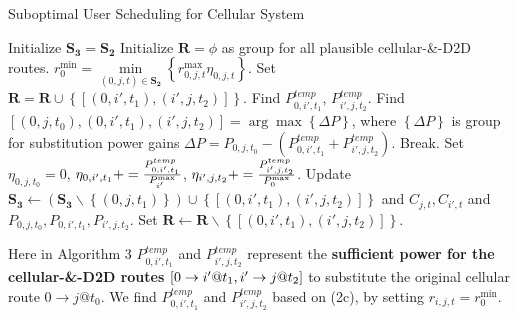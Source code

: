 \documentclass{ieeeaccess}
\begin{document}
\begin{algorithm}[!h]
\caption{Suboptimal User Scheduling for Cellular System}
\label{alg:1}
\begin{algorithmic}[1]
\STATE Initialize ${{\mathbf{S}}_{\mathbf{3}}}={{\mathbf{S}}_{\mathbf{2}}}$
  \STATE Initialize ${\mathbf{R}} = \phi $ as group for all plausible cellular-\&-D2D routes.
  \STATE $r_0^{\min } = \mathop {\min }\limits_{\left( {0,j,t} \right) \in {{\mathbf{S}}_{\mathbf{2}}}} \left\{ {r_{0,j,t}^{\max }{\eta _{0,j,t}}} \right\}$.
            \STATE Set ${\mathbf{R = R}} \cup \left\{ {\left[ {\left( {0,i',{t_1}} \right),\left( {i',j,{t_2}} \right)} \right]} \right\}$.
          \ENDIF
        \ENDFOR
      \ENDIF
    \ENDFOR
  \ENDFOR
    \STATE Find ${P_{0,i',{t_1}}^{temp}}$, ${P_{i',j,{t_2}}^{temp}}$. 
    \STATE Find $\left[ {\left( {0,j,{t_0}} \right),\left( {0,i',{t_1}} \right),\left( {i',j,{t_2}} \right)} \right] = \arg \max \left\{ {\Delta P} \right\}$, where ${\left\{ {\Delta P} \right\}}$ is group for substitution power gains $\Delta P = {P_{0,j,{t_0}}} - \left( {{P_{0,i',{t_1}}^{temp}} + {P_{i',j,{t_2}}^{temp}}} \right)$. 
      \STATE Break.
    \ENDIF
    \STATE Set ${\eta _{0,j,{t_0}} = 0}$, ${\eta _{0,i',{t_1}}} += \frac{{{P_{0,i',{t_1}}^{{\rm{temp}}}}}}{{P_{i'}^{\max }}}$, ${\eta _{i',j,{t_2}}} += \frac{{{P_{i',j,{t_2}}^{{\rm{temp}}}}}}{{P_{0}^{\max }}}$.
    \STATE Update ${{\mathbf{S}}_{\mathbf{3}}} \leftarrow \left( {{{\mathbf{S}}_{\mathbf{3}}}\backslash \left\{ {\left( {0,j,{t_1}} \right)} \right\}} \right) \cup \left\{ {\left[ {\left( {0,i',{t_1}} \right),\left( {i',j,{t_2}} \right)} \right]} \right\}$ and ${C_{j,t}},{C_{i',t}}$ and ${P_{0,j,{t_0}}},{P_{0,i',{t_1}}},{P_{i',j,{t_2}}}$.
    \STATE Set $\mathbf{R} \leftarrow \mathbf{R}\backslash \left\{ {\left[ {\left( {0,i',{t_1}} \right),\left( {i',j,{t_2}} \right)} \right]} \right\}$.
  \ENDWHILE
\ENDFOR
\end{algorithmic}
\end{algorithm}
Here in Algorithm 3 ${P_{0,i',{t_1}}^{temp}}$ and ${P_{i',j,{t_2}}^{temp}}$ represent the \textbf{sufficient power for the  cellular-\&-D2D routes} $\left[ {{\rm{0}} \to i'@{t_1},i' \to j@{t_2}} \right]$ to substitute the original cellular route $0 \to j @{t_0}$. We find ${P_{0,i',{t_1}}^{temp}}$ and ${P_{i',j,{t_2}}^{temp}}$ based on (2c), by setting ${r_{i,j,t}} = r_0^{\min }$.
\end{document}
